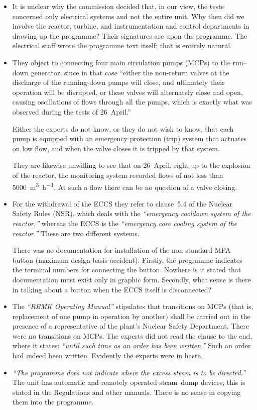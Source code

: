 \documentclass[openright]{bookest}
\begin{document}
\begin{itemize}
\item It is unclear why the commission decided that, in our view, the tests concerned only electrical systems and not the entire unit. Why then did we involve the reactor, turbine, and instrumentation and control departments in drawing up the programme? Their signatures are upon the programme. The electrical staff wrote the programme text itself; that is entirely natural.

\item They object to connecting four main circulation pumps (MCPs) to the run--down generator, since in that case ``either the non-return valves at the discharge of the running-down pumps will close, and ultimately their operation will be disrupted, or these valves will alternately close and open, causing oscillations of flows through all the pumps, which is exactly what was observed during the tests of 26~April.''

Either the experts do not know, or they do not wish to know, that each pump is equipped with an emergency protection (trip) system that actuates on low flow, and when the valve closes it is tripped by that system.

They are likewise unwilling to see that on 26~April, right up to the explosion of the reactor, the monitoring system recorded flows of not less than \qty{5000}{\meter\cubed\per\hour}. At such a flow there can be no question of a valve closing.

\item For the withdrawal of the ECCS they refer to clause~5.4 of the Nuclear Safety Rules (NSR), which deals with the \textit{``emergency cooldown system of the reactor,''} whereas the ECCS is the \textit{``emergency core cooling system of the reactor.''} These are two different systems.

There was no documentation for installation of the non-standard MPA button (maximum design-basis accident). Firstly, the programme indicates the terminal numbers for connecting the button. Nowhere is it stated that documentation must exist only in graphic form. Secondly, what sense is there in talking about a button when the ECCS itself is disconnected?

\item The \textit{``RBMK Operating Manual''} stipulates that transitions on MCPs (that is, replacement of one pump in operation by another) shall be carried out in the presence of a representative of the plant's Nuclear Safety Department. There were no transitions on MCPs. The experts did not read the clause to the end, where it states: \textit{``until such time as an order has been written.''} Such an order had indeed been written. Evidently the experts were in haste.

\item \textit{``The programme does not indicate where the excess steam is to be directed.''} The unit has automatic and remotely operated steam--dump devices; this is stated in the Regulations and other manuals. There is no sense in copying them into the programme.
\end{itemize}
\end{document}

